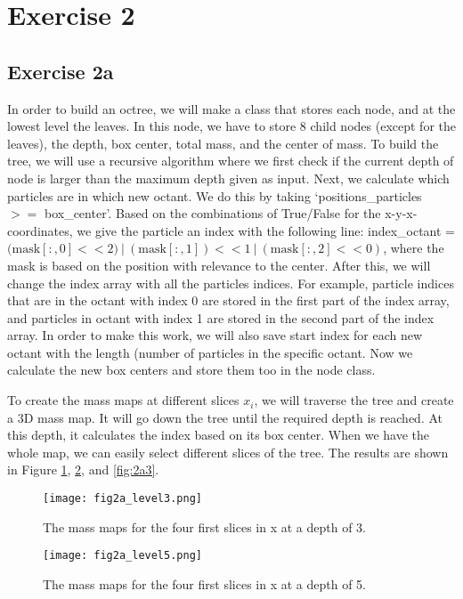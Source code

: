 \section{Exercise 2}

\subsection{Exercise 2a}
In order to build an octree, we will make a class that stores each node, and at the lowest level the leaves. In this node, we have to store 8 child nodes (except for the leaves), the depth, box center, total mass, and the center of mass. To build the tree, we will use a recursive algorithm where we first check if the current depth of node is larger than the maximum depth given as input. Next, we calculate which particles are in which new octant. We do this by taking `positions\_particles $>=$ box\_center'. Based on the combinations of True/False for the x-y-x-coordinates, we give the particle an index with the following line: index\_octant = $(\mathrm{mask[:,0] << 2)\ |\ (mask[:,1]) << 1\ |\ (mask[:,2] << 0)}$, where the mask is based on the position with relevance to the center. After this, we will change the index array with all the particles indices. For example, particle indices that are in the octant with index 0 are stored in the first part of the index array, and particles in octant with index 1 are stored in the second part of the index array. In order to make this work, we will also save start index for each new octant with the length (number of particles in the specific octant. Now we calculate the new box centers and store them too in the node class. 

To create the mass maps at different slices $x_i$, we will traverse the tree and create a 3D mass map. It will go down the tree until the required depth is reached. At this depth, it calculates the index based on its box center. When we have the whole map, we can easily select different slices of the tree. The results are shown in Figure \ref{fig:2a1}, \ref{fig:2a2}, and \ref{fig:2a3}.

\begin{figure}[h!]
  \centering
  \texttt{[image: fig2a\_level3.png]}
  \caption{The mass maps for the four first slices in x at a depth of 3.}
  \label{fig:2a1}
\end{figure}

\begin{figure}[h!]
  \centering
  \texttt{[image: fig2a\_level5.png]}
  \caption{The mass maps for the four first slices in x at a depth of 5.}
  \label{fig:2a2}
\end{figure}

